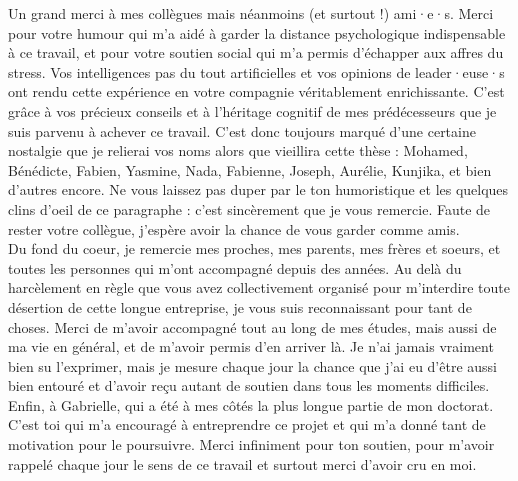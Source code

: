 Un grand merci à mes collègues mais néanmoins (et surtout !) ami·e·s. Merci pour votre humour qui m'a aidé à garder la distance psychologique indispensable à ce travail, et pour votre soutien social qui m'a permis d'échapper aux affres du stress. Vos intelligences pas du tout artificielles et vos opinions de leader·euse·s ont rendu cette expérience en votre compagnie véritablement enrichissante. C'est grâce à vos précieux conseils et à l'héritage cognitif de mes prédécesseurs que je suis parvenu à achever ce travail.
C'est donc toujours marqué d'une certaine nostalgie que je relierai vos noms alors que vieillira cette thèse : Mohamed, Bénédicte, Fabien, Yasmine, Nada, Fabienne, Joseph, Aurélie, Kunjika, et bien d'autres encore. Ne vous laissez pas duper par le ton humoristique et les quelques clins d'oeil de ce paragraphe : c'est sincèrement que je vous remercie. Faute de rester votre collègue, j'espère avoir la chance de vous garder comme amis. \\


Du fond du coeur, je remercie mes proches, mes parents, mes frères et soeurs, et toutes les personnes qui m'ont accompagné depuis des années. Au delà du harcèlement en règle que vous avez collectivement organisé pour m'interdire toute désertion de cette longue entreprise, je vous suis reconnaissant pour tant de choses. Merci de m'avoir accompagné tout au long de mes études, mais aussi de ma vie en général, et de m'avoir permis d'en arriver là. Je n'ai jamais vraiment bien su l'exprimer, mais je mesure chaque jour la chance que j'ai eu d'être aussi bien entouré et d'avoir reçu autant de soutien dans tous les moments difficiles. \\

Enfin, à Gabrielle, qui a été à mes côtés la plus longue partie de mon doctorat. C'est toi qui m'a encouragé à entreprendre ce projet et qui m'a donné tant de motivation pour le poursuivre. Merci infiniment pour ton soutien, pour m'avoir rappelé chaque jour le sens de ce travail et surtout merci d'avoir cru en moi. \\









